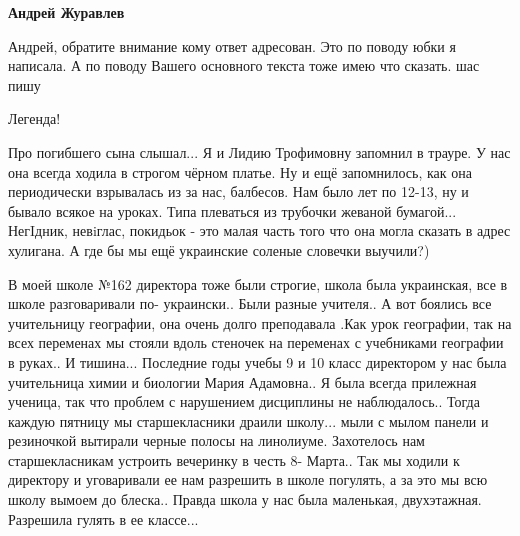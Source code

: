\begin{itemize}
\begin{itemize}
\begin{itemize}
\textbf{Андрей Журавлев} 

Андрей, обратите внимание кому ответ адресован. Это по поводу юбки я написала. А
по поводу Вашего основного текста тоже имею что сказать. шас пишу

\end{itemize} %

Легенда!


Про погибшего сына слышал... Я и Лидию Трофимовну запомнил в трауре. У нас она
всегда ходила в строгом чёрном платье. Ну и ещё запомнилось, как она
периодически взрывалась из за нас, балбесов. Нам было лет по 12-13, ну и бывало
всякое на уроках. Типа плеваться из трубочки жеваной бумагой... НегIдник,
невiглас, покидьок - это малая часть того что она могла сказать в адрес
хулигана. А где бы мы ещё украинские соленые словечки выучили?)

\end{itemize} %


В моей школе №162 директора тоже были строгие, школа была украинская, все в
школе разговаривали по- украински.. Были разные учителя.. А вот боялись все
учительницу географии, она очень долго преподавала .Как урок географии, так на
всех переменах мы стояли вдоль стеночек на переменах с учебниками географии в
руках.. И тишина... Последние годы учебы 9 и 10 класс директором у нас была
учительница химии и биологии Мария Адамовна.. Я была всегда прилежная ученица,
так что проблем с нарушением дисциплины не наблюдалось.. Тогда каждую пятницу
мы старшекласники драили школу... мыли с мылом панели и резиночкой вытирали
черные полосы на линолиуме. Захотелось нам старшекласникам устроить вечеринку в
честь 8- Марта.. Так мы ходили к директору и уговаривали ее нам разрешить в
школе погулять, а за это мы всю школу вымоем до блеска.. Правда школа у нас была
маленькая, двухэтажная. Разрешила гулять в ее классе...

\end{itemize} %
